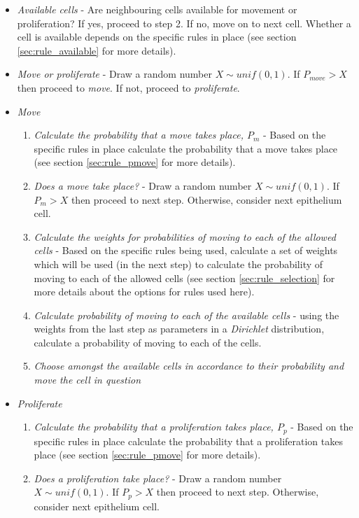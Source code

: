 \documentclass[pdftex,10pt,a4paper]{article}
\begin{document}
\begin{itemize}
\item \textit{Available cells} - Are neighbouring cells available for movement or proliferation? If yes, proceed to step 2. If no, move on to next cell. Whether a cell is available depends on the specific rules in place (see section \ref{sec:rule_available} for more details).
\item \textit{Move or proliferate} - Draw a random number $X\sim unif(0,1)$. If $P_{move}>X$ then proceed to \textit{move}. If not, proceed to \textit{proliferate}.
\item \textit{Move} 
\begin{enumerate}
\item \textit{Calculate the probability that a move takes place, $P_m$} - Based on the specific rules in place calculate the probability that a move takes place (see section \ref{sec:rule_pmove} for more details).
\item \textit{Does a move take place?} - Draw a random number $X\sim unif(0,1)$. If $P_{m}>X$ then proceed to next step. Otherwise, consider next epithelium cell.
\item \textit{Calculate the weights for probabilities of moving to each of the allowed cells} - Based on the specific rules being used, calculate a set of weights which will be used (in the next step) to calculate the probability of moving to each of the allowed cells (see section \ref{sec:rule_selection} for more details about the options for rules used here). 
\item \textit{Calculate probability of moving to each of the available cells} - using the weights from the last step as parameters in a \textit{Dirichlet} distribution, calculate a probability of moving to each of the cells. 
\item \textit{Choose amongst the available cells in accordance to their probability and move the cell in question}
\end{enumerate} 
\item \textit{Proliferate}
\begin{enumerate}
\item \textit{Calculate the probability that a proliferation takes place, $P_p$} - Based on the specific rules in place calculate the probability that a proliferation takes place (see section \ref{sec:rule_pmove} for more details).
\item \textit{Does a proliferation take place?} - Draw a random number $X\sim unif(0,1)$. If $P_{p}>X$ then proceed to next step. Otherwise, consider next epithelium cell.

\end{enumerate}
\end{itemize}
\end{document}
